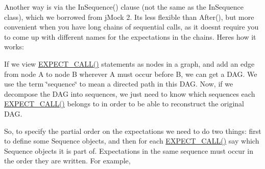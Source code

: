 Another way is via the {\ttfamily In\+Sequence()} clause (not the same as the {\ttfamily In\+Sequence} class), which we borrowed from j\+Mock 2. It\textquotesingle{}s less flexible than {\ttfamily After()}, but more convenient when you have long chains of sequential calls, as it doesn\textquotesingle{}t require you to come up with different names for the expectations in the chains. Here\textquotesingle{}s how it works\+:

If we view {\ttfamily \mbox{\hyperlink{googletest-master_2googlemock_2include_2gmock_2gmock-spec-builders_8h_a535a6156de72c1a2e25a127e38ee5232}{E\+X\+P\+E\+C\+T\+\_\+\+C\+A\+L\+L()}}} statements as nodes in a graph, and add an edge from node A to node B wherever A must occur before B, we can get a D\+AG. We use the term \char`\"{}sequence\char`\"{} to mean a directed path in this D\+AG. Now, if we decompose the D\+AG into sequences, we just need to know which sequences each {\ttfamily \mbox{\hyperlink{googletest-master_2googlemock_2include_2gmock_2gmock-spec-builders_8h_a535a6156de72c1a2e25a127e38ee5232}{E\+X\+P\+E\+C\+T\+\_\+\+C\+A\+L\+L()}}} belongs to in order to be able to reconstruct the original D\+AG.

So, to specify the partial order on the expectations we need to do two things\+: first to define some {\ttfamily Sequence} objects, and then for each {\ttfamily \mbox{\hyperlink{googletest-master_2googlemock_2include_2gmock_2gmock-spec-builders_8h_a535a6156de72c1a2e25a127e38ee5232}{E\+X\+P\+E\+C\+T\+\_\+\+C\+A\+L\+L()}}} say which {\ttfamily Sequence} objects it is part of. Expectations in the same sequence must occur in the order they are written. For example,


\begin{DoxyCode}{0}
\DoxyCodeLine{}
\DoxyCodeLine{}
\end{DoxyCode}



